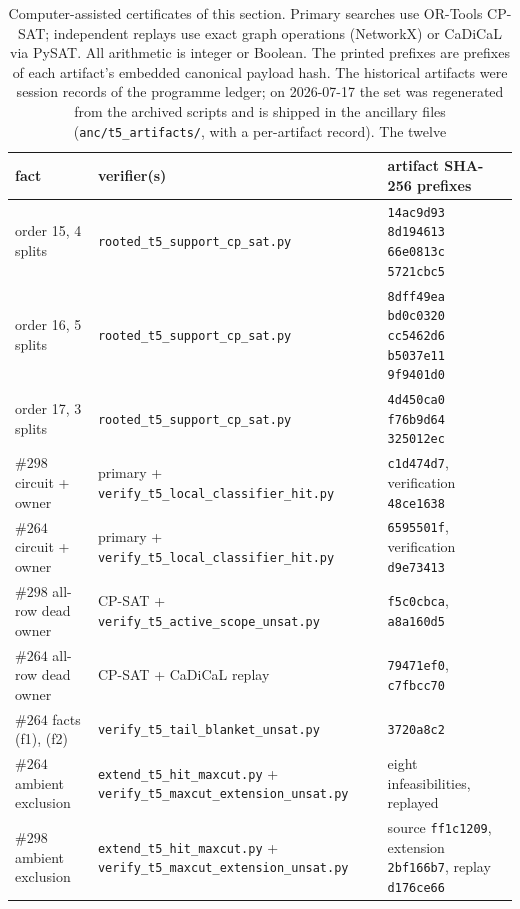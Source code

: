 \begin{table}[ht]
\centering
\small
\begin{tabular}{lll}
\toprule
fact & verifier(s) & artifact SHA-256 prefixes\\
\midrule
order 15, 4 splits & \texttt{rooted\_t5\_support\_cp\_sat.py} &
\texttt{14ac9d93} \texttt{8d194613} \texttt{66e0813c}
\texttt{5721cbc5}\\
order 16, 5 splits & \texttt{rooted\_t5\_support\_cp\_sat.py} &
\texttt{8dff49ea} \texttt{bd0c0320} \texttt{cc5462d6}
\texttt{b5037e11} \texttt{9f9401d0}\\
order 17, 3 splits & \texttt{rooted\_t5\_support\_cp\_sat.py} &
\texttt{4d450ca0} \texttt{f76b9d64} \texttt{325012ec}\\
\(\#298\) circuit + owner & primary +
\texttt{verify\_t5\_local\_classifier\_hit.py} &
\texttt{c1d474d7}, verification \texttt{48ce1638}\\
\(\#264\) circuit + owner & primary +
\texttt{verify\_t5\_local\_classifier\_hit.py} &
\texttt{6595501f}, verification \texttt{d9e73413}\\
\(\#298\) all-row dead owner & CP-SAT +
\texttt{verify\_t5\_active\_scope\_unsat.py} &
\texttt{f5c0cbca}, \texttt{a8a160d5}\\
\(\#264\) all-row dead owner & CP-SAT + CaDiCaL replay &
\texttt{79471ef0}, \texttt{c7fbcc70}\\
\(\#264\) facts (f1), (f2) &
\texttt{verify\_t5\_tail\_blanket\_unsat.py} &
\texttt{3720a8c2}\\
\(\#264\) ambient exclusion & \texttt{extend\_t5\_hit\_maxcut.py} +
\texttt{verify\_t5\_maxcut\_extension\_unsat.py} & eight
infeasibilities, replayed\\
\(\#298\) ambient exclusion & \texttt{extend\_t5\_hit\_maxcut.py} +
\texttt{verify\_t5\_maxcut\_extension\_unsat.py} &
source \texttt{ff1c1209}, extension \texttt{2bf166b7}, replay
\texttt{d176ce66}\\
\bottomrule
\end{tabular}
\caption{Computer-assisted certificates of this section. Primary
searches use OR-Tools CP-SAT; independent replays use exact graph
operations (NetworkX) or CaDiCaL via PySAT. All arithmetic is integer
or Boolean. The printed prefixes are prefixes of each artifact's
embedded canonical payload hash. The historical artifacts were session
records of the programme ledger; on 2026-07-17 the set was regenerated
from the archived scripts and is shipped in the ancillary files
(\texttt{anc/t5\_artifacts/}, with a per-artifact record). The twelve
}
\end{table}
